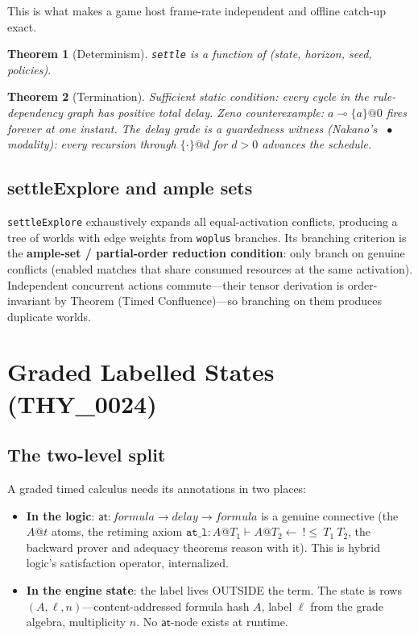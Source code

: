 \documentclass[11pt]{article}
\makeatletter
\newcommand{\loli}{\multimap}                   %
\newcommand{\laxm}[2]{\{#1\}@{#2}}
\newcommand{\laxb}[1]{\{#1\}}
\newtheorem{theorem}{Theorem}[section]
\theoremstyle{remark}
\makeatother
\begin{document}
This is what makes a game host frame-rate independent and offline catch-up exact.

\begin{theorem}[Determinism]
\texttt{settle} is a function of (state, horizon, seed, policies).
\end{theorem}

\begin{theorem}[Termination]
Sufficient static condition: every cycle in the rule-dependency graph has
positive total delay.  \textit{Zeno counterexample}: $a \loli \laxm{a}{0}$
fires forever at one instant.  The delay grade is a guardedness witness
(Nakano's~\cite{Nakano00} $\bullet$ modality): every recursion through
$\laxb{\cdot}@d$ for $d > 0$ advances the schedule.
\end{theorem}

\subsection{settleExplore and ample sets}
\label{sec:settle-explore}

\texttt{settleExplore} exhaustively expands all equal-activation conflicts,
producing a tree of worlds with edge weights from \texttt{woplus} branches.  Its
branching criterion is the \textbf{ample-set / partial-order reduction condition}:
only branch on genuine conflicts (enabled matches that share consumed resources at
the same activation).  Independent concurrent actions commute---their tensor
derivation is order-invariant by Theorem (Timed Confluence)---so branching on
them produces duplicate worlds.

\section{Graded Labelled States (THY\_0024)}
\label{sec:labelled-states}

\subsection{The two-level split}
\label{sec:two-level}

A graded timed calculus needs its annotations in two places:

\begin{itemize}
\item \textbf{In the logic}: $\mathsf{at} : \mathit{formula} \to \mathit{delay}
  \to \mathit{formula}$ is a genuine connective (the $A@t$ atoms, the retiming
  axiom $\mathtt{at\_l}: A@T_1 \vdash A@T_2 \leftarrow\ !{\le}\ T_1\ T_2$, the
  backward prover and adequacy theorems reason with it).  This is hybrid logic's
  satisfaction operator, internalized.
\item \textbf{In the engine state}: the label lives OUTSIDE the term.  The state
  is rows $(A, \ell, n)$---content-addressed formula hash $A$, label $\ell$ from
  the grade algebra, multiplicity $n$.  No $\mathsf{at}$-node exists at runtime.
\end{itemize}
\end{document}
